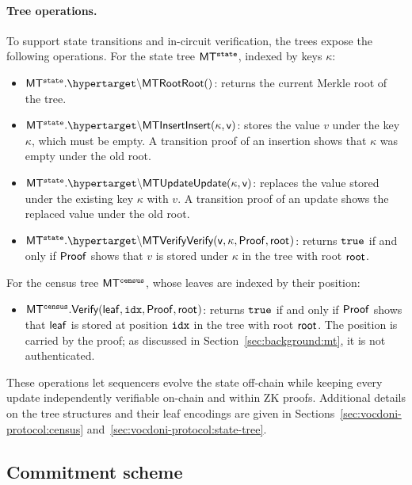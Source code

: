 \paragraph{Tree operations.} To support state transitions and in-circuit verification, the trees expose the following operations. For the state tree $\sf{MT^{\texttt{state}}}$, indexed by keys $\kappa$:
\begin{itemize}
	\item $\stateTree.\hlset{\MTRoot}()$: returns the current Merkle root of the tree.
	\item $\stateTree.\hlset{\MTInsert}(\kappa, v)$: stores the value $v$ under the key $\kappa$, which must be empty. A transition proof of an insertion shows that $\kappa$ was empty under the old root.
	\item $\stateTree.\hlset{\MTUpdate}(\kappa, v)$: replaces the value stored under the existing key $\kappa$ with $v$. A transition proof of an update shows the replaced value under the old root.
	\item $\stateTree.\hlset{\MTVerify}(v, \kappa, \MTProof, \root{})$: returns $\texttt{true}$ if and only if ${\sf Proof}$ shows that $v$ is stored under $\kappa$ in the tree with root $\sf{root}^{\sf{}}{}$.
\end{itemize}
For the census tree $\sf{MT^{\texttt{census}}}$, whose leaves are indexed by their position:
\begin{itemize}
	\item $\sf{MT^{\texttt{census}}}.\text{\sf{Verify}}({\sf leaf}, \texttt{idx}, {\sf Proof}, \sf{root}^{\sf{}}{})$: returns $\texttt{true}$ if and only if ${\sf Proof}$ shows that ${\sf leaf}$ is stored at position $\texttt{idx}$ in the tree with root $\sf{root}^{\sf{}}{}$. The position is carried by the proof; as discussed in Section~\ref{sec:background:mt}, it is not authenticated.
\end{itemize}
These operations let sequencers evolve the state off-chain while keeping every update independently verifiable on-chain and within \ac{ZK} proofs. Additional details on the tree structures and their leaf encodings are given in Sections~\ref{sec:vocdoni-protocol:census} and~\ref{sec:vocdoni-protocol:state-tree}.

\subsection{Commitment scheme}
\label{sec:cryptographic-primitives:commitments}

